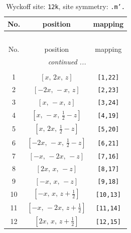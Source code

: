 \documentclass[fleqn,8pt]{jsarticle}
\begin{document}
\begin{longtable}{ccc}
\caption{Wyckoff site: {\tt 12k}, site symmetry: {\tt .m'.}}
 \\
 \hline \hline
No. & position & mapping \\ \hline \endfirsthead

\multicolumn{2}{l}{\tablename\ \thetable{}} \\
 \hline \hline
No. & position & mapping \\ \hline \endhead

 \hline \hline
\multicolumn{2}{r}{\footnotesize\it continued ...} \\ \endfoot

 \hline \hline
\multicolumn{2}{r}{} \\ \endlastfoot

1 & $\left[ x,\, 2 x,\, z \right]$ & {\tt [1,22]} \\ \hline
2 & $\left[ - 2 x,\, - x,\, z \right]$ & {\tt [2,23]} \\ \hline
3 & $\left[ x,\, - x,\, z \right]$ & {\tt [3,24]} \\ \hline
4 & $\left[ x,\, - x,\, \frac{1}{2} - z \right]$ & {\tt [4,19]} \\ \hline
5 & $\left[ x,\, 2 x,\, \frac{1}{2} - z \right]$ & {\tt [5,20]} \\ \hline
6 & $\left[ - 2 x,\, - x,\, \frac{1}{2} - z \right]$ & {\tt [6,21]} \\ \hline
7 & $\left[ - x,\, - 2 x,\, - z \right]$ & {\tt [7,16]} \\ \hline
8 & $\left[ 2 x,\, x,\, - z \right]$ & {\tt [8,17]} \\ \hline
9 & $\left[ - x,\, x,\, - z \right]$ & {\tt [9,18]} \\ \hline
10 & $\left[ - x,\, x,\, z + \frac{1}{2} \right]$ & {\tt [10,13]} \\ \hline
11 & $\left[ - x,\, - 2 x,\, z + \frac{1}{2} \right]$ & {\tt [11,14]} \\ \hline
12 & $\left[ 2 x,\, x,\, z + \frac{1}{2} \right]$ & {\tt [12,15]} \\
\end{longtable}
\renewcommand{\arraystretch}{1.2}
\end{document}
